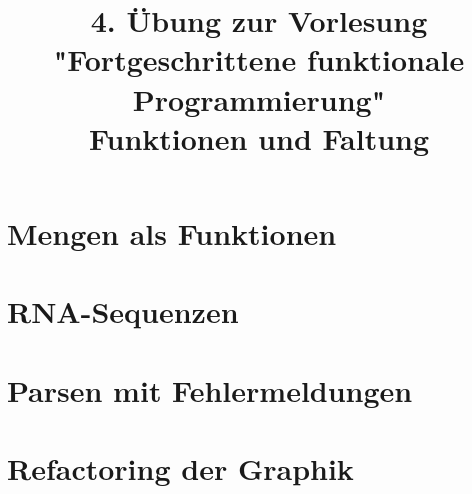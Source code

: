 \documentclass[a4paper]{article}
\title{\small{4. Übung zur Vorlesung "Fortgeschrittene funktionale Programmierung"}\\\vspace{.5cm}\huge{Funktionen und Faltung}}
\begin{document}
\maketitle

\section{Mengen als Funktionen}



\pagebreak

\section{RNA-Sequenzen}



\section{Parsen mit Fehlermeldungen}

\section{Refactoring der Graphik}
\end{document}
